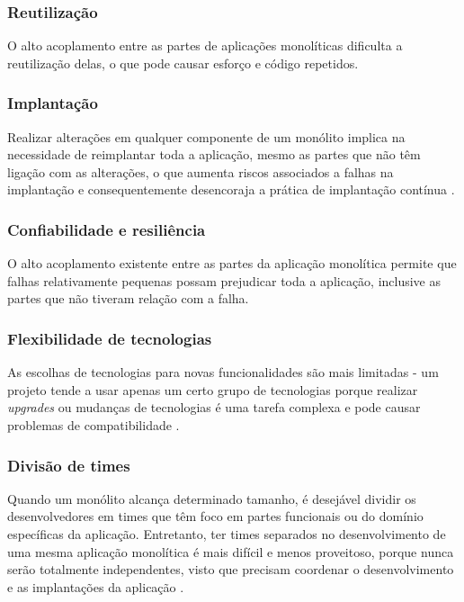 \subsubsection{Reutilização}
O alto acoplamento entre as partes de aplicações monolíticas dificulta a reutilização delas, o que pode causar esforço e código repetidos.

\subsubsection{Implantação}
Realizar alterações em qualquer componente de um monólito implica na necessidade de reimplantar toda a aplicação, mesmo as partes que não têm ligação com as alterações, o que aumenta riscos associados a falhas na implantação e consequentemente desencoraja a prática de implantação contínua \cite{microservicesIO_monolithic_architecture}.

\subsubsection{Confiabilidade e resiliência}
O alto acoplamento existente entre as partes da aplicação monolítica permite que falhas relativamente pequenas possam prejudicar toda a aplicação, inclusive as partes que não tiveram relação com a falha.

\subsubsection{Flexibilidade de tecnologias}
As escolhas de tecnologias para novas funcionalidades são mais limitadas - um projeto tende a usar apenas um certo grupo de tecnologias porque realizar \emph{upgrades} ou mudanças de tecnologias é uma tarefa complexa e pode causar problemas de compatibilidade \cite{microservicesIO_monolithic_architecture}.

\subsubsection{Divisão de times}
Quando um monólito alcança determinado tamanho, é desejável dividir os desenvolvedores em times que têm foco em partes funcionais ou do domínio específicas da aplicação. Entretanto, ter times separados no desenvolvimento de uma mesma aplicação monolítica é mais difícil e menos proveitoso, porque nunca serão totalmente independentes, visto que precisam coordenar o desenvolvimento e as implantações da aplicação \cite{microservicesIO_monolithic_architecture}.

